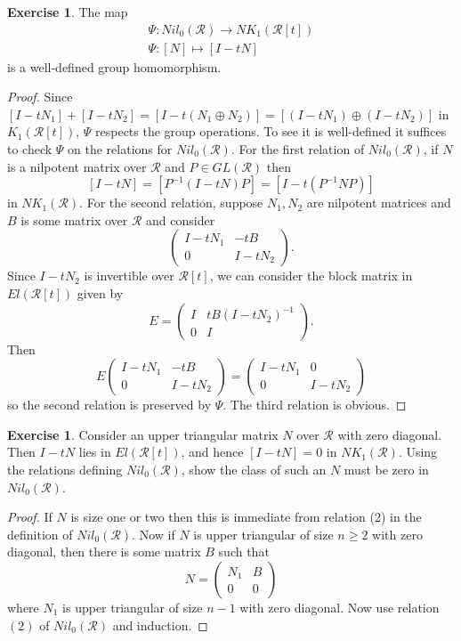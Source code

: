 \documentclass{amsart}
\theoremstyle{definition}
\newtheorem{exer}[equation]{Exercise}
\theoremstyle{definition}
\newcommand{\calR}{\mathcal{R}}
\numberwithin{equation}{subsection}
\begin{document}
\begin{exer}\label{appexer:psiwelldefined}
The map
\begin{equation}
\begin{gathered}
\Psi \colon Nil_{0}(\calR) \to NK_{1}(\calR[t])\\
\Psi \colon [N] \mapsto [I-tN]
\end{gathered}
\end{equation}
is a well-defined group homomorphism.
\end{exer}
\begin{proof}
Since $[I-tN_{1}] + [I-tN_{2}] = [I-t(N_{1} \oplus N_{2})] = [(I-tN_{1}) \oplus (I-tN_{2})]$ in $K_{1}(\calR[t])$, $\Psi$ respects the group operations. To see it is well-defined it suffices to check $\Psi$ on the relations for $Nil_{0}(\calR)$. For the first relation of $Nil_{0}(\calR)$, if $N$ is a nilpotent matrix over $\calR$ and $P \in GL(\calR)$ then
$$[I-tN] = [P^{-1}(I-tN)P] = [I-t(P^{-1}NP)]$$
in $NK_{1}(\calR)$. For the second relation, suppose $N_{1},N_{2}$ are nilpotent matrices and $B$ is some matrix over $\calR$ and consider
$$\begin{pmatrix} I-tN_{1} & -tB \\ 0 & I - tN_{2} \end{pmatrix}.$$
Since $I-tN_{2}$ is invertible over $\calR[t]$, we can consider the block matrix in $El(\calR[t])$ given by
$$E = \begin{pmatrix} I & tB(I-tN_{2})^{-1} \\ 0 & I \end{pmatrix}.$$
Then
$$E \begin{pmatrix} I-tN_{1} & -tB \\ 0 & I - tN_{2} \end{pmatrix} = \begin{pmatrix} I-tN_{1} & 0 \\ 0 & I-tN_{2} \end{pmatrix}$$
so the second relation is preserved by $\Psi$. The third relation is obvious.
\end{proof}

\begin{exer}\label{appexer:uppertrivanish}
Consider an upper triangular matrix $N$ over $\calR$ with zero diagonal. Then $I-tN$ lies in $El(\calR[t])$, and hence $[I-tN] = 0$ in $NK_{1}(\calR)$. Using the relations defining $Nil_{0}(\calR)$, show the class of such an $N$ must be zero in $Nil_{0}(\calR)$.
\end{exer}
\begin{proof}
If $N$ is size one or two then this is immediate from relation (2) in the definition of $Nil_{0}(\calR)$. Now if $N$ is upper triangular of size $n \ge 2$ with zero diagonal, then there is some matrix $B$ such that
$$N = \begin{pmatrix} N_{1} & B \\ 0 & 0 \end{pmatrix}$$
where $N_{1}$ is upper triangular of size $n-1$ with zero diagonal. Now use relation $(2)$ of $Nil_{0}(\calR)$ and induction.
\end{proof}
\end{document}
